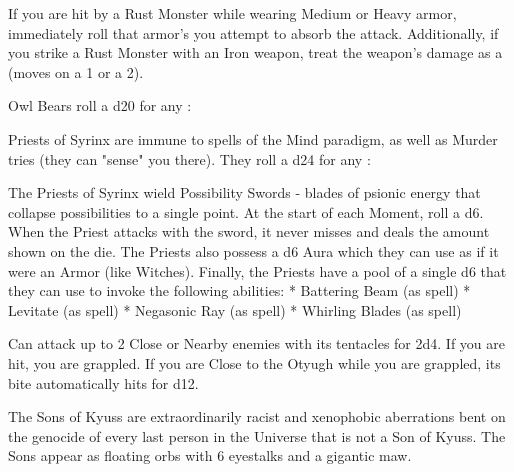{\MONSTERBLOCK[
  Name=Rust Monster,
  Link=monster-rust-monster,
  MV=Base,
  WK=d20,
  DMG=d4 1 Close,
  HD=3,
  Power=Average,
  Soak=1,
  Morale=Orderly,
  Save=2,
  Extras={}
]
If you are hit by a Rust Monster while wearing Medium or Heavy armor, immediately roll that armor's \UD {} you attempt to absorb the attack.  Additionally, if you strike a Rust Monster with an Iron weapon, treat the weapon's damage as a \UD (moves \DCDOWN on a 1 or a 2).

\MONSTERBLOCK[
  Name=Owl Bear,
  Link=monster-owl-bear,
  MV=Base,
  WK=d12,
  DMG=d6+d8 2 Close,
  HD=5,
  Power=Strong,
  Soak=0,
  Morale=Fanatical,
  Save=3,
  Extras={Bloodthirsty}
]
Owl Bears roll a d20 for any \RB : \VIG 

\MONSTERBLOCK[
  Name=Priest of Syrinx,
  Link=monster-priest-of syrinx,
  MV=Base,
  WK=d12,
  DMG=[see below 3 Nearby,
  HD=5,
  Power=Weak,
  Soak=0,
  Morale=Cowardly,
  Save=3,
  Extras={}
]
Priests of Syrinx are immune to spells of the Mind paradigm, as well as Murder tries  (they can "sense" you there). They roll a d24 for any \RB : \INT 
  
The Priests of Syrinx wield Possibility Swords - blades of psionic energy that collapse possibilities to a single point.  At the start of each Moment, roll a d6.  When the Priest attacks with the sword, it never misses and deals the amount shown on the die. 
The Priests also possess a d6 Aura which they can use as if it were an Armor \UD (like Witches).
Finally, the Priests have a {pool} of a single d6 that they can use to invoke the following abilities:
* Battering Beam (as spell)
* Levitate (as spell)
* Negasonic Ray (as spell)
* Whirling Blades (as spell)

\MONSTERBLOCK[
  Name=Otyugh,
  Link=monster-otyugh,
  MV=Base,
  WK=d10,
  DMG=d12 / 2d4 1 Close + 2 Nearby,
  HD=7,
  Power=Average,
  Soak=0,
  Morale=Orderly,
  Save=4,
  Extras={}
]
Can attack up to 2 Close or Nearby enemies with its tentacles for 2d4.  If you are hit, you are grappled.  If you are Close to the Otyugh while you are grappled, its bite automatically hits for d12.


\MONSTERBLOCK[
  Name=Son of Kyuss,
  Link=monster-son-of kyuss,
  MV=Base,
  WK=d6,
  DMG=2d10 1 Close,
  HD=8,
  Power=Weak,
  Soak=0,
  Morale=Orderly,
  Save=5,
  Extras={Berserk, Keen}
]

The Sons of Kyuss are extraordinarily racist and xenophobic aberrations bent on the genocide of every last person in the Universe that is not a Son of Kyuss.  The Sons appear as floating orbs with 6 eyestalks and a gigantic maw.

}
